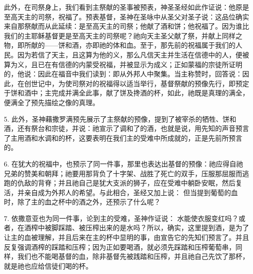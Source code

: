 此外，在司祭身上，我们看到主祭献的圣事被预表，神圣圣经如此作证说：他原是至高天主的司祭，祝福了。预表基督，圣神在圣咏中从圣父对圣子说：这品位确实来自那祭献而从此延续：是至高天主的司祭；他献了酒和饼；他祝福了。因为谁比我们的主耶稣基督更是至高天主的司祭呢？祂向天主圣父献了祭，并献上同样之物，即所献的——饼和酒，亦即祂的体和血。至于，那先前的祝福属于我们的人民。因为若信了天主，且这算为他的义，那么凡信天主并生活在信德中的人，便被算为义，且已在有信德的内蒙受祝福，并被显示为成义；正如蒙福的宗徒所证明的，他说：因此在福音中我们读到：即从外邦人中聚集。当主称赞时，回答说：因此，在创世记中，为使司祭对的祝福得以适当举行，基督祭献的预像先行，即预定于饼和酒中；主完成并满全此事，献了饼及搀酒的杯，如此，祂既是真理的满全，便满全了预先描绘之像的真理。\par

5. 此外，圣神藉撒罗满预先展示了主祭献的预像，提到了被宰杀的牺牲、饼和酒，还有祭台和宗徒，并说：祂宣示了调和了的酒，也就是说，用先知的声音预言了主用酒和水调和的杯，这要表明在我们主的受难中所成就的，正是先前所预言的。\par

6. 在犹大的祝福中，也预示了同一件事，那里也表达出基督的预像：祂应得自祂兄弟的赞美和朝拜；祂要用那背负了十字架、战胜了死亡的双手，压服那屈服而逃跑的仇敌的背脊；并且祂自己是犹大支派的狮子，应在受难中躺卧安眠，然后复活，并亲自成为外邦人的希望。与此相合，圣经又加上说： 但当提到葡萄的血时，除了主的血之杯中的酒之外，还预示了什么呢？\par

7. 依撒意亚也为同一件事，论到主的受难，圣神作证说： 水能使衣服变红吗？或者，在酒榨中被脚踩踏、被压榨出来的是水吗？所以，确实，这里提到酒，是为了让主的血被理解，并且后来在主的杯中显明的事，由宣告它的先知们预言了。并且反复强调酒榨的踩踏和压榨；因为正如要喝酒，就必须先踩踏和压榨葡萄串，同样，我们也不能喝基督的血，除非基督先被践踏和压榨，并且祂自己先饮了那杯，就是祂也应给信徒们喝的杯。\par

